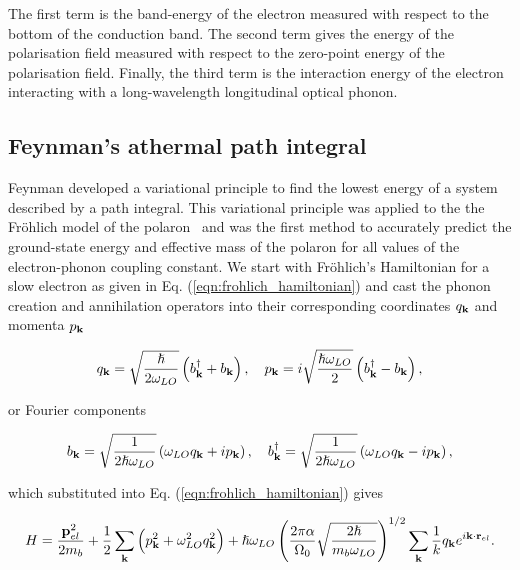 The first term is the band-energy of the electron measured with respect to the bottom of the conduction band. The second term gives the energy of the polarisation field measured with respect to the zero-point energy of the polarisation field. Finally, the third term is the interaction energy of the electron interacting with a long-wavelength longitudinal optical phonon.

\subsection{Feynman's athermal path integral}

Feynman developed a variational principle to find the lowest energy of a system described by a path integral. This variational principle was applied to the the Fr\"ohlich model of the polaron~\cite{frohlich_electrons_1954} and was the first method to accurately predict the ground-state energy and effective mass of the polaron for all values of the electron-phonon coupling constant. We start with Fr\"ohlich's Hamiltonian for a slow electron as given in Eq. (\ref{eqn:frohlich_hamiltonian}) and cast the phonon creation and annihilation operators into their corresponding coordinates $q_{\vb{k}}$ and momenta $p_{\vb{k}}$

\begin{equation}
   q_{\vb{k}} = \sqrt{\frac{\hslash}{2\omega_{LO}}} \left(b^\dagger_{\vb{k}} + b_{\vb{k}} \right), \quad p_{\vb{k}} = i\sqrt{\frac{\hslash \omega_{LO}}{2}} \left(b^\dagger_{\vb{k}} - b_{\vb{k}} \right),
\end{equation}

or Fourier components

\begin{equation}
   b_{\vb{k}} = \sqrt{\frac{1}{2\hslash\omega_{LO}}} \left(\omega_{LO} q_{\vb{k}} + i p_{\vb{k}} \right), \quad b^\dagger_{\vb{k}} = \sqrt{\frac{1}{2\hslash\omega_{LO}}} \left(\omega_{LO} q_{\vb{k}} - i p_{\vb{k}} \right),
\end{equation}

which substituted into Eq. (\ref{eqn:frohlich_hamiltonian}) gives

\begin{equation}
    H = \frac{\vb{p}_{el}^2}{2m_b} + \frac{1}{2} \sum_{\vb{k}} \left( p_{\vb{k}}^2 + \omega_{LO}^2 q_{\vb{k}}^2 \right) + \hslash \omega_{LO} \left(\frac{2 \pi \alpha}{\Omega_0} \sqrt{\frac{2 \hslash}{m_b \omega_{LO}}}\right)^{1/2} \sum_{\vb{k}} \frac{1}{k} q_{\vb{k}} e^{i \vb{k} \cdot \vb{r}_{el}}.
\end{equation}

